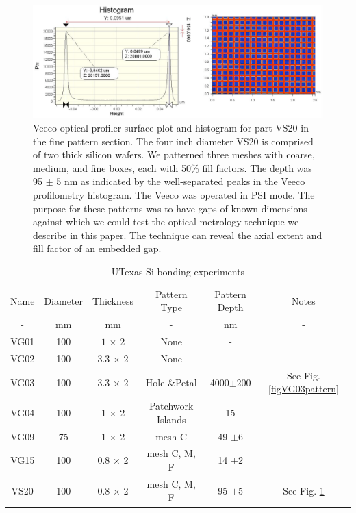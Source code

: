 \documentclass[osajnl,preprint,showpacs,superscriptaddress,12pt]{revtex4-1} %
\begin{document}
\begin{figure}[htbp]
\centerline{\includegraphics[width=1.0\columnwidth]{figs/VS20fineGapCrop.pdf}}
\caption{Veeco optical profiler surface plot and histogram for part VS20 in the fine pattern section\label{figVS20pattern}.  The four inch diameter VS20 is comprised of two thick silicon wafers.  We patterned three meshes with coarse, medium, and fine boxes, each with 50\% fill factors.  The depth was 95 $\pm$ 5 nm as indicated by the well-separated peaks in the Veeco profilometry histogram.  The Veeco was operated in PSI mode.  The purpose for these patterns was to have gaps of known dimensions against which we could test the optical metrology technique we describe in this paper.  The technique can reveal the axial extent and fill factor of an embedded gap.  }
\end{figure}


\begin{table}[h!]
\caption{UTexas Si bonding experiments \label{tabbondexper}}
\begin{center}
    \begin{tabular}{ c c c c c c}
    \hline
    Name & Diameter & Thickness & Pattern Type & Pattern Depth & Notes \\ 
    -  & mm & mm & - & nm & - \\ 
        \hline
    VG01  & 100  &$1$ $\times$ 2 & None  & - &  \\
    VG02   & 100 & $3.3$ $\times$ 2 &  None  & - &  \\
    VG03   & 100 & $3.3$ $\times$ 2 &  Hole \&Petal & 4000$\pm$200 & See Fig. \ref{figVG03pattern}\\    
    VG04   & 100 & $1$ $\times$ 2 &  Patchwork Islands & 15 & \\
    VG09   & 75 & $1$ $\times$ 2 & mesh C & 49 $\pm$6 & \\
    VG15   & 100 & $0.8$ $\times$ 2 &  mesh C, M, F  &14 $\pm$2 & \\
    VS20   & 100 & $0.8$ $\times$ 2 &  mesh C, M, F & 95 $\pm$5 & See Fig. \ref{figVS20pattern}\\
    \hline
    \end{tabular}
\end{center}
\end{table}
\end{document}

